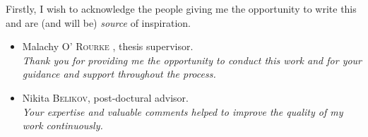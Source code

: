 \mynewline
Firstly, I wish to acknowledge the people giving me the opportunity to write this and are (and will be) \textit{source} of inspiration.
\begin{itemize}
    \item Malachy \textsc{O' Rourke} , thesis supervisor.
          \\\textit{Thank you for providing me the opportunity to conduct this work and for your guidance and support throughout the process.}

    \item Nikita \textsc{Belikov}, post-doctural advisor.
          \\\textit{Your expertise and valuable comments helped to improve the quality of my work continuously.}





\end{itemize}

